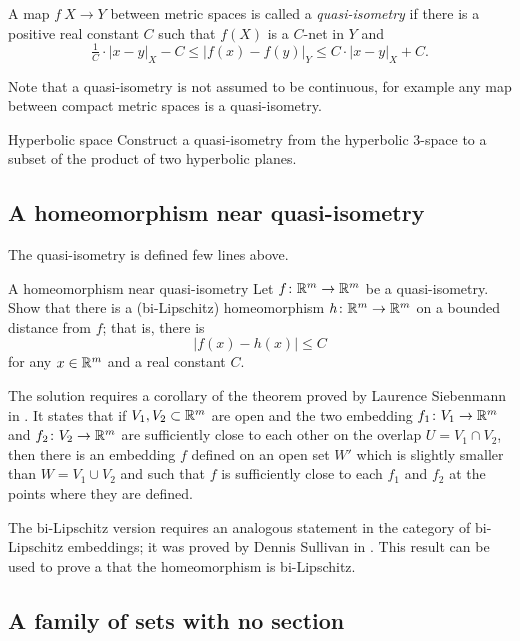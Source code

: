 A map $f\:X\to Y$ between metric spaces is called a \emph{quasi-isometry} if there is a positive real constant $C$ such that $f(X)$ is a $C$-net in $Y$ and
$$\tfrac{1}{C}\cdot|x-y|_X-C
\le 
|f(x)-f(y)|_Y\le C\cdot|x-y|_X+C.$$

Note that a quasi-isometry is not assumed to be continuous, for example any map between compact metric spaces is a quasi-isometry.

\begin{pr}{}{Hyperbolic space}\label{Hyperbolic space}
Construct a quasi-isometry
from the hyperbolic $3$-space 
to a subset 
of the product of two hyperbolic planes.
\end{pr}

\subsection*{A homeomorphism near quasi-isometry\thm}

The quasi-isometry is defined few lines above.

\begin{pr}{\thm}{A homeomorphism near quasi-isometry}\label{hom-near-QI} 
Let $f\colon\mathbb{R}^m\to\mathbb{R}^m$ be a quasi-isometry.
Show that there is a (bi-Lipschitz) homeomorphism 
$h\colon\mathbb{R}^m\to\mathbb{R}^m$ on a bounded distance from $f$;
that is, there is 
$$|f(x)-h(x)|\le C$$
for any $x\in\mathbb{R}^m$ and a real constant $C$.
\end{pr}

The solution requires a corollary of the theorem  proved by Laurence Siebenmann in \cite{siebenmann}.
It states that 
if $V_1, V_2\subset\mathbb{R}^m$ are open
and the two embedding $f_1\colon V_1\to\mathbb{R}^m$ and $f_2\colon V_2\to\mathbb{R}^m$ 
are sufficiently close to each other 
on the overlap $U=V_1\cap V_2$, 
then
there is an embedding $f$ defined on an open set $W'$
which is slightly smaller than $W=V_1\cup V_2$
and such that $f$ is sufficiently close to each $f_1$ and $f_2$ at the points where they are defined.

The  bi-Lipschitz version requires 
an analogous statement in the category of bi-Lipschitz embeddings;
it was proved by
Dennis Sullivan in \cite{sullivan}.
This result can be used to prove a that the homeomorphism is bi-Lipschitz.

\subsection*{A family of sets with no section}

